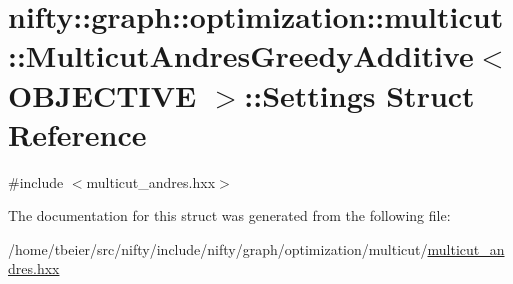 \hypertarget{structnifty_1_1graph_1_1optimization_1_1multicut_1_1MulticutAndresGreedyAdditive_1_1Settings}{}\section{nifty\+:\+:graph\+:\+:optimization\+:\+:multicut\+:\+:Multicut\+Andres\+Greedy\+Additive$<$ O\+B\+J\+E\+C\+T\+I\+V\+E $>$\+:\+:Settings Struct Reference}
\label{structnifty_1_1graph_1_1optimization_1_1multicut_1_1MulticutAndresGreedyAdditive_1_1Settings}


{\ttfamily \#include $<$multicut\+\_\+andres.\+hxx$>$}



The documentation for this struct was generated from the following file\+:\begin{DoxyCompactItemize}
\item 
/home/tbeier/src/nifty/include/nifty/graph/optimization/multicut/\hyperlink{multicut__andres_8hxx}{multicut\+\_\+andres.\+hxx}\end{DoxyCompactItemize}
